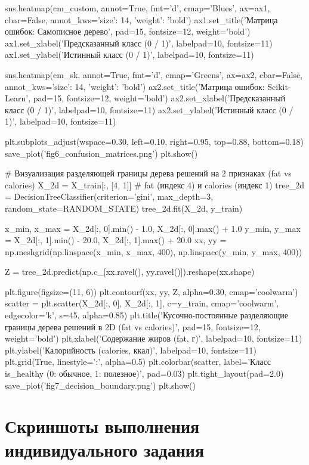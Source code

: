 \documentclass[14pt,a4paper]{extarticle}
\begin{document}
\begin{CodeListing}
sns.heatmap(cm_custom, annot=True, fmt='d', cmap='Blues', ax=ax1, cbar=False, annot_kws={'size': 14, 'weight': 'bold'})
ax1.set_title('Матрица ошибок: Самописное дерево', pad=15, fontsize=12, weight='bold')
ax1.set_xlabel('Предсказанный класс (0 / 1)', labelpad=10, fontsize=11)
ax1.set_ylabel('Истинный класс (0 / 1)', labelpad=10, fontsize=11)

sns.heatmap(cm_sk, annot=True, fmt='d', cmap='Greens', ax=ax2, cbar=False, annot_kws={'size': 14, 'weight': 'bold'})
ax2.set_title('Матрица ошибок: Scikit-Learn', pad=15, fontsize=12, weight='bold')
ax2.set_xlabel('Предсказанный класс (0 / 1)', labelpad=10, fontsize=11)
ax2.set_ylabel('Истинный класс (0 / 1)', labelpad=10, fontsize=11)

plt.subplots_adjust(wspace=0.30, left=0.10, right=0.95, top=0.88, bottom=0.18)
save_plot('fig6_confusion_matrices.png')
plt.show()

# Визуализация разделяющей границы дерева решений на 2 признаках (fat vs calories)
X_2d = X_train[:, [4, 1]]  # fat (индекс 4) и calories (индекс 1)
tree_2d = DecisionTreeClassifier(criterion='gini', max_depth=3, random_state=RANDOM_STATE)
tree_2d.fit(X_2d, y_train)

x_min, x_max = X_2d[:, 0].min() - 1.0, X_2d[:, 0].max() + 1.0
y_min, y_max = X_2d[:, 1].min() - 20.0, X_2d[:, 1].max() + 20.0
xx, yy = np.meshgrid(np.linspace(x_min, x_max, 400), np.linspace(y_min, y_max, 400))

Z = tree_2d.predict(np.c_[xx.ravel(), yy.ravel()]).reshape(xx.shape)

plt.figure(figsize=(11, 6))
plt.contourf(xx, yy, Z, alpha=0.30, cmap='coolwarm')
scatter = plt.scatter(X_2d[:, 0], X_2d[:, 1], c=y_train, cmap='coolwarm', edgecolor='k', s=45, alpha=0.85)
plt.title('Кусочно-постоянные разделяющие границы дерева решений в 2D (fat vs calories)', pad=15, fontsize=12, weight='bold')
plt.xlabel('Содержание жиров (fat, г)', labelpad=10, fontsize=11)
plt.ylabel('Калорийность (calories, ккал)', labelpad=10, fontsize=11)
plt.grid(True, linestyle=':', alpha=0.5)
plt.colorbar(scatter, label='Класс is_healthy (0: обычное, 1: полезное)', pad=0.03)
plt.tight_layout(pad=2.0)
save_plot('fig7_decision_boundary.png')
plt.show()
\end{CodeListing}

\section{Скриншоты выполнения индивидуального задания}
\end{document}
